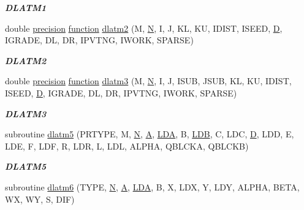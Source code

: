\begin{DoxyCompactItemize}
\begin{DoxyCompactList}\small\item\em {\bfseries D\+L\+A\+T\+M1} \end{DoxyCompactList}\item 
double \hyperlink{numinquire_8h_a2c8e616467665d0b2814d4c1589ba74e}{precision} \hyperlink{afunc_8m_a7b5e596df91eadea6c537c0825e894a7}{function} \hyperlink{group__double__matgen_gabde2322c6945954ef3ccb1ad10fb4e7c}{dlatm2} (M, \hyperlink{polmisc_8c_a0240ac851181b84ac374872dc5434ee4}{N}, I, J, K\+L, K\+U, I\+D\+I\+S\+T, I\+S\+E\+E\+D, \hyperlink{odrpack_8h_a7dae6ea403d00f3687f24a874e67d139}{D}, I\+G\+R\+A\+D\+E, D\+L, D\+R, I\+P\+V\+T\+N\+G, I\+W\+O\+R\+K, S\+P\+A\+R\+S\+E)
\begin{DoxyCompactList}\small\item\em {\bfseries D\+L\+A\+T\+M2} \end{DoxyCompactList}\item 
double \hyperlink{numinquire_8h_a2c8e616467665d0b2814d4c1589ba74e}{precision} \hyperlink{afunc_8m_a7b5e596df91eadea6c537c0825e894a7}{function} \hyperlink{group__double__matgen_ga2a6e2bb39fef79266ac7a58bf69f2f41}{dlatm3} (M, \hyperlink{polmisc_8c_a0240ac851181b84ac374872dc5434ee4}{N}, I, J, I\+S\+U\+B, J\+S\+U\+B, K\+L, K\+U, I\+D\+I\+S\+T, I\+S\+E\+E\+D, \hyperlink{odrpack_8h_a7dae6ea403d00f3687f24a874e67d139}{D}, I\+G\+R\+A\+D\+E, D\+L, D\+R, I\+P\+V\+T\+N\+G, I\+W\+O\+R\+K, S\+P\+A\+R\+S\+E)
\begin{DoxyCompactList}\small\item\em {\bfseries D\+L\+A\+T\+M3} \end{DoxyCompactList}\item 
subroutine \hyperlink{group__double__matgen_ga13322803aa9677dfd46544b0d9fadf00}{dlatm5} (P\+R\+T\+Y\+P\+E, M, \hyperlink{polmisc_8c_a0240ac851181b84ac374872dc5434ee4}{N}, \hyperlink{classA}{A}, \hyperlink{example__user_8c_ae946da542ce0db94dced19b2ecefd1aa}{L\+D\+A}, B, \hyperlink{example__user_8c_a50e90a7104df172b5a89a06c47fcca04}{L\+D\+B}, C, L\+D\+C, \hyperlink{odrpack_8h_a7dae6ea403d00f3687f24a874e67d139}{D}, L\+D\+D, E, L\+D\+E, F, L\+D\+F, R, L\+D\+R, L, L\+D\+L, A\+L\+P\+H\+A, Q\+B\+L\+C\+K\+A, Q\+B\+L\+C\+K\+B)
\begin{DoxyCompactList}\small\item\em {\bfseries D\+L\+A\+T\+M5} \end{DoxyCompactList}\item 
subroutine \hyperlink{group__double__matgen_gaabd1a22d830fde1eca3dfb5f61f05e16}{dlatm6} (T\+Y\+P\+E, \hyperlink{polmisc_8c_a0240ac851181b84ac374872dc5434ee4}{N}, \hyperlink{classA}{A}, \hyperlink{example__user_8c_ae946da542ce0db94dced19b2ecefd1aa}{L\+D\+A}, B, X, L\+D\+X, Y, L\+D\+Y, A\+L\+P\+H\+A, B\+E\+T\+A, W\+X, W\+Y, S, D\+I\+F)

\end{DoxyCompactItemize}
